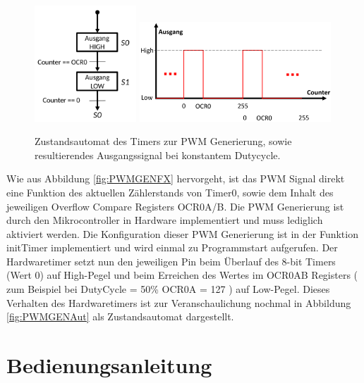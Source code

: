 \documentclass[a4paper, 11pt]{report}
\begin{document}
\begin{figure}[htp]
	\centering
        {\includegraphics[width=0.34\textwidth]{rec/zustandsautomatPWM.png}}
        \hfill
        {\includegraphics[width=0.64\textwidth]{rec/graphPWM.png}}
    \caption{Zustandsautomat des Timers zur PWM Generierung, sowie resultierendes Ausgangssignal bei konstantem Dutycycle.}


\end{figure}




Wie aus Abbildung \ref{fig:PWMGENFX} hervorgeht, ist das PWM Signal direkt eine Funktion des aktuellen Zählerstands von Timer0, sowie dem Inhalt des jeweiligen Overflow Compare Registers OCR0A/B.
Die PWM Generierung ist durch den Mikrocontroller in Hardware implementiert und muss lediglich aktiviert werden. Die Konfiguration dieser PWM Generierung ist in der Funktion initTimer implementiert und wird einmal zu Programmstart aufgerufen. Der Hardwaretimer setzt nun den jeweiligen Pin beim Überlauf des 8-bit Timers (Wert 0) auf High-Pegel und beim Erreichen des Wertes im OCR0AB Registers ( zum Beispiel  bei DutyCycle = 50\% OCR0A = 127 ) auf Low-Pegel.
Dieses Verhalten des Hardwaretimers ist zur Veranschaulichung nochmal in Abbildung  \ref{fig:PWMGENAut} als Zustandsautomat dargestellt.



\chapter{Bedienungsanleitung}
\end{document}
